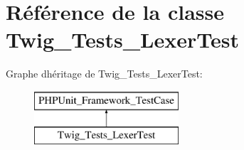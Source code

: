 \hypertarget{class_twig___tests___lexer_test}{}\section{Référence de la classe Twig\+\_\+\+Tests\+\_\+\+Lexer\+Test}
\label{class_twig___tests___lexer_test}
Graphe d\textquotesingle{}héritage de Twig\+\_\+\+Tests\+\_\+\+Lexer\+Test\+:\begin{figure}[H]
\begin{center}
\leavevmode
\includegraphics[height=2.000000cm]{class_twig___tests___lexer_test}
\end{center}
\end{figure}
